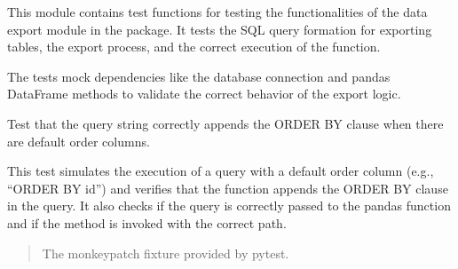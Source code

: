 \documentclass[letterpaper,10pt,english]{sphinxmanual}
\begin{document}
\sphinxAtStartPar
This module contains test functions for testing the functionalities
of the data export module in the  package. It tests
the SQL query formation for exporting tables, the export process,
and the correct execution of the  function.

\sphinxAtStartPar
The tests mock dependencies like the database connection and pandas
DataFrame methods to validate the correct behavior of the export logic.

\begin{fulllineitems}
\label{\detokenize{test.data_storage:test.data_storage.test_data_export.test_export_table_query_with_order}}
\pysigstartsignatures
\pysiglinewithargsret
{}
{}
{}
\pysigstopsignatures
\sphinxAtStartPar
Test that the query string correctly appends the ORDER BY clause
when there are default order columns.

\sphinxAtStartPar
This test simulates the execution of a query with a default order
column (e.g., “ORDER BY id”) and verifies that the 
function appends the ORDER BY clause in the query. It also checks if the
query is correctly passed to the pandas  function and if
the  method is invoked with the correct path.
\begin{quote}\begin{description}
\sphinxAtStartPar
{} \textendash{} The monkeypatch fixture provided by pytest.

\end{description}\end{quote}

\end{fulllineitems}

\end{document}
